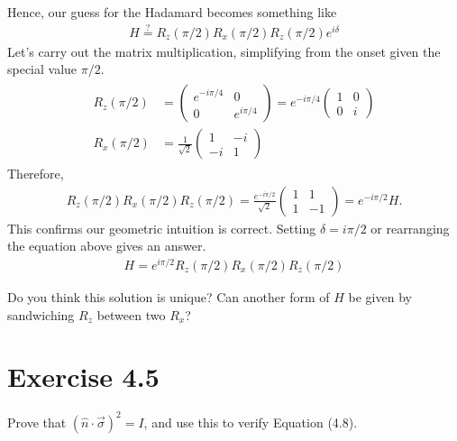 \documentclass{book}
\begin{document}
    Hence, our guess for the Hadamard becomes something like
    \begin{align}
        H \stackrel{?}{=} R_z(\pi/2) R_x(\pi/2) R_z(\pi/2) e^{i\delta}
    \end{align}
    Let's carry out the matrix multiplication, simplifying from the onset given the special value $\pi/2$. 
    \begin{align}
    \begin{aligned}
        R_z(\pi/2) &= \begin{pmatrix}
            e^{-i\pi/4} & 0 \\
            0 & e^{i\pi/4}
        \end{pmatrix} = e^{-i\pi/4}\begin{pmatrix}
                1 & 0 \\
                0 & i
        \end{pmatrix} \\
        R_x(\pi/2) &= \frac{1}{\sqrt{2}} \begin{pmatrix}
            1 & -i \\
            -i & 1
        \end{pmatrix}
    \end{aligned}
    \end{align}
    Therefore,
    \begin{align}
        R_z(\pi/2) R_x(\pi/2) R_z(\pi/2) = \frac{e^{-i\pi/2}}{\sqrt{2}} \begin{pmatrix}
            1 & 1 \\
            1 & -1
        \end{pmatrix} = e^{-i\pi/2} H. 
    \end{align}
    This confirms our geometric intuition is correct. Setting $\delta = i\pi/2$ or rearranging the equation above gives an answer. 
    \begin{align}
        H = e^{i\pi/2} R_z(\pi/2) R_x(\pi/2) R_z(\pi/2)
    \end{align}
     
     Do you think this solution is unique? Can another form of $H$ be given by sandwiching $R_z$ between two $R_x$?
    
\section*{Exercise 4.5}
    Prove that $(\hat{n} \cdot \vec{\sigma})^2 = I$, and use this to verify Equation (4.8).
    
\end{document}
